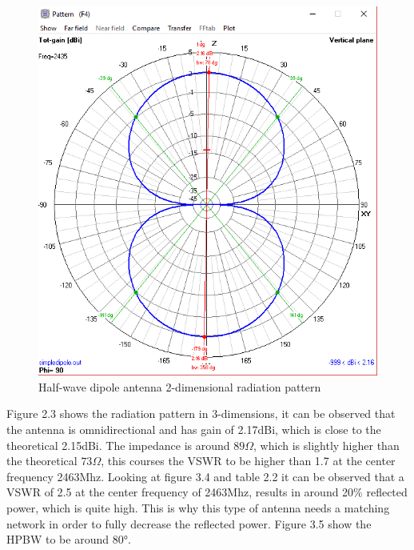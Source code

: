 \begin{figure}[h!]
\centering
\includegraphics[scale=0.7]{figures/DipoleRadiationPattern.PNG}
\caption{Half-wave dipole antenna 2-dimensional radiation pattern}
\end{figure}

Figure 2.3 shows the radiation pattern in 3-dimensions, it can be observed that the antenna is omnidirectional and has gain of 2.17dBi, which is close to the theoretical 2.15dBi. The impedance is around $89\Omega$, which is slightly higher than the theoretical $73\Omega$, this courses the VSWR to be higher than 1.7 at the center frequency 2463Mhz. Looking at figure 3.4 and table 2.2 it can be observed that a VSWR of 2.5 at the center frequency of 2463Mhz, results in around 20\% reflected power, which is quite high. This is why this type of antenna needs a matching network in order to fully decrease the reflected power. Figure 3.5 show the HPBW to be around \ang{80}.     

\newpage

